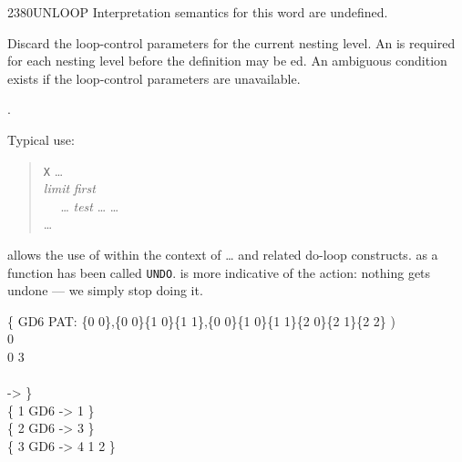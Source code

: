 \begin{worddef}{2380}{UNLOOP}
\interpret
	Interpretation semantics for this word are undefined.

\execute
	\stack{}{}

	Discard the loop-control parameters for the current nesting
	level. An  is required for each nesting level
	before the definition may be ed. An ambiguous
	condition exists if the loop-control parameters are unavailable.

\see {}.

	\begin{defer}
	\rationale %
		Typical use:
		\begin{quote}
			\word{:} \texttt{X} {\ldots} \\
			\tab \emph{limit} \emph{first}  \\
			\tab~~ {\ldots} \emph{test} 
				{\ldots}    {\ldots} \\
			\tab {} {\ldots} \\
			\word{;}
		\end{quote}

		 allows the use of  within the context
		of  {\ldots}  and related do-loop constructs.
		 as a function has been called \texttt{UNDO}.
		 is more indicative of the action: nothing gets
		undone --- we simply stop doing it.

	\testing
		\{ \word{:} GD6  PAT: {\small \{0 0\},\{0 0\}\{1 0\}\{1 1\},\{0 0\}\{1 0\}\{1 1\}\{2 0\}\{2 1\}\{2 2\}} ) \\
			  0  \\
			\tab[3]   0 
				  \word{+} 3 \word{=} 
					\word{I} \word{UNLOOP}      \\
			\tab[2]  \\
			\tab	{} \word{;} -> \} \\
		\{ 1 GD6 -> 1 \} \\
		\{ 2 GD6 -> 3 \} \\
		\{ 3 GD6 -> 4 1 2 \}
	\end{defer}
\end{worddef}


